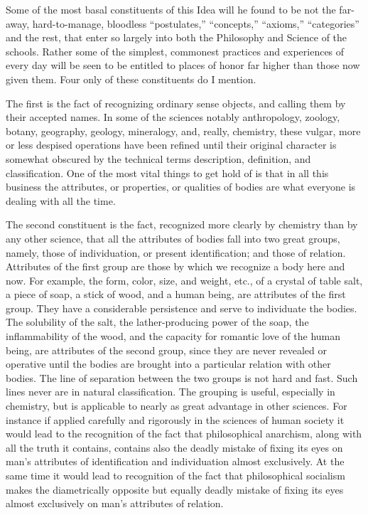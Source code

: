 \documentclass[a4paper, 11pt, oneside, polutonikogreek, english]{article}
\begin{document}
Some of the most basal constituents of this Idea will he found to be not the far-away, hard-to-manage, bloodless ``postulates,'' ``concepts,'' ``axioms,'' ``categories'' and the rest, that enter so largely into both the Philosophy and Science of the schools. Rather some of the simplest, commonest practices and experiences of every day will be seen to be entitled to places of honor far higher than those now given them. Four only of these constituents do I mention.

The first is the fact of recognizing ordinary sense objects, and calling them by their accepted names. In some of the sciences notably anthropology, zoology, botany, geography, geology, mineralogy, and, really, chemistry, these vulgar, more or less despised operations have been refined until their original character is somewhat obscured by the technical terms description, definition, and classification. One of the most vital things to get hold of is that in all this business the attributes, or properties, or qualities of bodies are what everyone is dealing with all the time.

The second constituent is the fact, recognized more clearly by chemistry than by any other science, that all the attributes of bodies fall into two great groups, namely, those of individuation, or present identification; and those of relation. Attributes of the first group are those by which we recognize a body here and now. For example, the form, color, size, and weight, etc., of a crystal of table salt, a piece of soap, a stick of wood, and a human being, are attributes of the first group. They have a considerable persistence and serve to individuate the bodies. The solubility of the salt, the lather-producing power of the soap, the inflammability of the wood, and the capacity for romantic love of the human being, are attributes of the second group, since they are never revealed or operative until the bodies are brought into a particular relation with other bodies. The line of separation between the two groups is not hard and fast. Such lines never are in natural classification. The grouping is useful, especially in chemistry, but is applicable to nearly as great advantage in other sciences. For instance if applied carefully and rigorously in the sciences of human society it would lead to the recognition of the fact that philosophical anarchism, along with all the truth it contains, contains also the deadly mistake of fixing its eyes on man's attributes of identification and individuation almost exclusively. At the same time it would lead to recognition of the fact that philosophical socialism makes the diametrically opposite but equally deadly mistake of fixing its eyes almost exclusively on man's attributes of relation.
\end{document}
